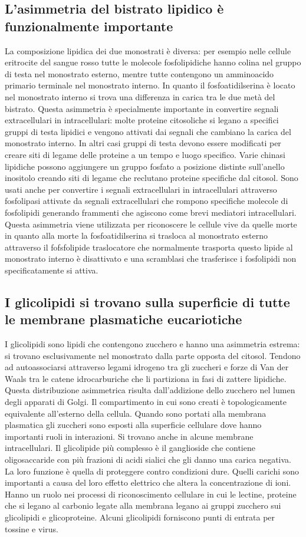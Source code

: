 \subsection{L'asimmetria del bistrato lipidico \`e funzionalmente importante}
La composizione lipidica dei due monostrati \`e diversa: per esempio nelle cellule eritrocite del sangue rosso tutte le molecole fosfolipidiche hanno colina nel gruppo di testa nel 
monostrato esterno, mentre tutte contengono un amminoacido primario terminale nel monostrato interno. In quanto il fosfoatidilserina \`e locato nel monostrato interno si trova una
differenza in carica tra le due met\`a del bistrato. Questa asimmetria \`e specialmente importante in convertire segnali extracellulari in intracellulari: molte proteine citosoliche
si legano a specifici gruppi di testa lipidici e vengono attivati dai segnali che cambiano la carica del monostrato interno. In altri casi gruppi di testa devono essere modificati per 
creare siti di legame delle proteine a un tempo e luogo specifico. Varie chinasi lipidiche possono aggiungere un gruppo fosfato a posizione distinte sull'anello inositolo creando siti
di legame che reclutano proteine specifiche dal citosol. Sono usati anche per convertire i segnali extracellulari in intracellulari attraverso fosfolipasi attivate da segnali 
extracellulari che rompono specifiche molecole di fosfolipidi generando frammenti che agiscono come brevi mediatori intracellulari. Questa asimmetria viene utilizzata per riconoscere
le cellule vive da quelle morte in quanto alla morte la fosfoatidilserina si trasloca al monostrato esterno attraverso il fofsfolipide traslocatore che normalmente trasporta questo
lipide al monostrato interno \`e disattivato e una scramblasi che trasferisce i fosfolipidi non specificatamente si attiva.
\subsection{I glicolipidi si trovano sulla superficie di tutte le membrane plasmatiche eucariotiche}
I glicolipidi sono lipidi che contengono zucchero e hanno una asimmetria estrema: si trovano esclusivamente nel monostrato dalla parte opposta del citosol. Tendono ad autoassociarsi
attraverso legami idrogeno tra gli zuccheri e forze di Van der Waals tra le catene idrocarburiche che li partiziona in fasi di zattere lipidiche. Questa distribuzione asimmetrica
risulta dall'addizione dello zucchero nel lumen degli apparati di Golgi. Il compartimento in cui sono creati \`e topologicamente equivalente all'esterno della cellula. Quando sono 
portati alla membrana plasmatica gli zuccheri sono esposti alla superficie cellulare dove hanno importanti ruoli in interazioni. Si trovano anche in alcune membrane intracellulari. Il
glicolipide pi\`u complesso \`e il ganglioside che contiene oligosaccaride con pi\`u frazioni di acidi sialici che gli danno una carica negativa. La loro funzione \`e quella di 
proteggere contro condizioni dure. Quelli carichi sono importanti a causa del loro effetto elettrico che altera la concentrazione di ioni. Hanno un ruolo nei processi di riconoscimento
cellulare in cui le lectine, proteine che si legano al carbonio legate alla membrana legano ai gruppi zucchero sui glicolipidi e glicoproteine. Alcuni glicolipidi forniscono punti di 
entrata per tossine e virus.
